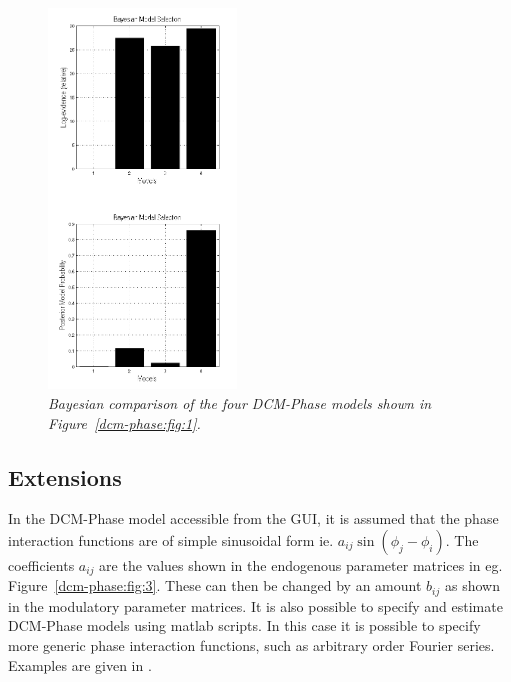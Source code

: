 \begin{figure}
\begin{center}
\includegraphics[width=50mm]{multimodal/figures/bms-phase}
\caption{\em Bayesian comparison of the four DCM-Phase models shown in Figure~\ref{dcm-phase:fig:1}.\label{dcm-phase:fig:4}}
\end{center}
\end{figure}

\subsection{Extensions}

In the DCM-Phase model accessible from the GUI, it is assumed that the phase interaction functions are of simple sinusoidal form ie. $a_{ij} \sin(\phi_j - \phi_i)$. The coefficients $a_{ij}$ are the values shown in the endogenous 
parameter matrices in eg. Figure~\ref{dcm-phase:fig:3}. These can then be changed by an amount $b_{ij}$ as shown in the modulatory parameter matrices. 
It is also possible to specify and estimate DCM-Phase models using matlab scripts. In this case it is possible to specify more generic phase interaction functions, such as arbitrary order Fourier series. Examples are given in \cite{dcm_phase}.

